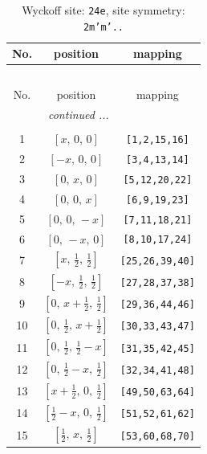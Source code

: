 \documentclass[fleqn,8pt]{jsarticle}
\begin{document}
\begin{longtable}{ccc}
\caption{Wyckoff site: {\tt 24e}, site symmetry: {\tt 2m'm'..}}
 \\
 \hline \hline
No. & position & mapping \\ \hline \endfirsthead

\multicolumn{2}{l}{\tablename\ \thetable{}} \\
 \hline \hline
No. & position & mapping \\ \hline \endhead

 \hline \hline
\multicolumn{2}{r}{\footnotesize\it continued ...} \\ \endfoot

 \hline \hline
\multicolumn{2}{r}{} \\ \endlastfoot

1 & $\left[ x,\, 0,\, 0 \right]$ & {\tt [1,2,15,16]} \\ \hline
2 & $\left[ - x,\, 0,\, 0 \right]$ & {\tt [3,4,13,14]} \\ \hline
3 & $\left[ 0,\, x,\, 0 \right]$ & {\tt [5,12,20,22]} \\ \hline
4 & $\left[ 0,\, 0,\, x \right]$ & {\tt [6,9,19,23]} \\ \hline
5 & $\left[ 0,\, 0,\, - x \right]$ & {\tt [7,11,18,21]} \\ \hline
6 & $\left[ 0,\, - x,\, 0 \right]$ & {\tt [8,10,17,24]} \\ \hline
7 & $\left[ x,\, \frac{1}{2},\, \frac{1}{2} \right]$ & {\tt [25,26,39,40]} \\ \hline
8 & $\left[ - x,\, \frac{1}{2},\, \frac{1}{2} \right]$ & {\tt [27,28,37,38]} \\ \hline
9 & $\left[ 0,\, x + \frac{1}{2},\, \frac{1}{2} \right]$ & {\tt [29,36,44,46]} \\ \hline
10 & $\left[ 0,\, \frac{1}{2},\, x + \frac{1}{2} \right]$ & {\tt [30,33,43,47]} \\ \hline
11 & $\left[ 0,\, \frac{1}{2},\, \frac{1}{2} - x \right]$ & {\tt [31,35,42,45]} \\ \hline
12 & $\left[ 0,\, \frac{1}{2} - x,\, \frac{1}{2} \right]$ & {\tt [32,34,41,48]} \\ \hline
13 & $\left[ x + \frac{1}{2},\, 0,\, \frac{1}{2} \right]$ & {\tt [49,50,63,64]} \\ \hline
14 & $\left[ \frac{1}{2} - x,\, 0,\, \frac{1}{2} \right]$ & {\tt [51,52,61,62]} \\ \hline
15 & $\left[ \frac{1}{2},\, x,\, \frac{1}{2} \right]$ & {\tt [53,60,68,70]} \\ \hline

\end{longtable}
\end{document}

